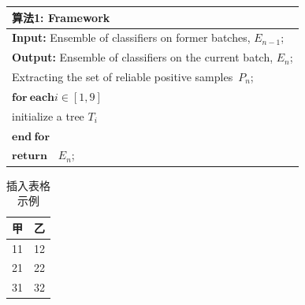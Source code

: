 \documentclass[UTF8]{beamer}
\begin{document}
\begin{frame}[fragile]
    \begin{table}[!hbp]
    \centering
    \begin{tabular}{l}
    \hline
    \bf{算法1: Framework} \\
    \hline
    {\bfseries Input:} %
    Ensemble of classifiers on former batches, $E_{n-1}$;  \\
    {\bfseries Output:} %
    Ensemble of classifiers on the current batch, $E_n$;  \\
    Extracting the set of reliable positive samples\ $P_n$;   \\
    \label{ code:fram:extract }%
    $\mathbf{for\ each} i \in [1,9]$ \\
    \quad initialize a tree $T_{i}$\\  
    $\mathbf{end\ for}$ \\
    $\mathbf{return} \quad E_n$; \\ %
    \hline
    \end{tabular}
    \end{table}

\end{frame}

\begin{frame}
\begin{table}[!hbp]
\centering
\begin{tabular}{c|c}
	\hline
	甲 &乙\\
	\hline
	11 & 12\\
	21 & 22\\
	31 & 32\\
	\hline
\end{tabular}
\caption{插入表格示例}
\label{tab1}
\end{table}
\end{frame}
\end{document}
